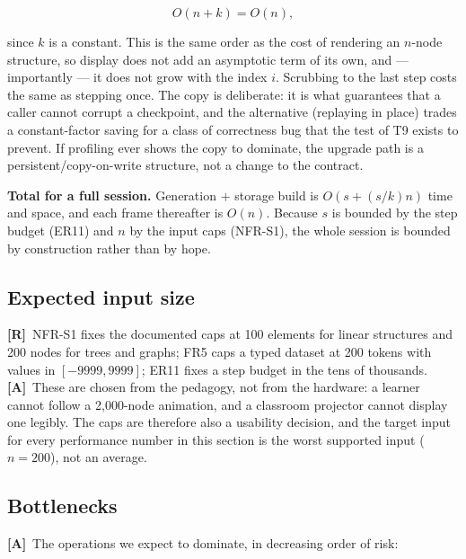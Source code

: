 \documentclass[11pt,a4paper]{article}
\newcommand{\R}{\textcolor{reqc}{\textbf{[R]}}}     %
\newcommand{\A}{\textcolor{asmc}{\textbf{[A]}}}     %
\begin{document}
\[
O(n + k) = O(n),
\]

since $k$ is a constant. This is the same order as the cost of rendering an $n$-node
structure, so display does not add an asymptotic term of its own, and --- importantly --- it
does not grow with the index $i$. Scrubbing to the last step costs the same as stepping once.
The copy is deliberate: it is what guarantees that a caller cannot corrupt a checkpoint, and
the alternative (replaying in place) trades a constant-factor saving for a class of
correctness bug that the test of T9 exists to prevent. If profiling ever shows the copy to
dominate, the upgrade path is a persistent/copy-on-write structure, not a change to the
contract.

\smallskip
\noindent\textbf{Total for a full session.} Generation $+$ storage build is
$O(s + (s/k)n)$ time and space, and each frame thereafter is $O(n)$. Because $s$ is bounded
by the step budget (ER11) and $n$ by the input caps (NFR-S1), the whole session is bounded by
construction rather than by hope.

\subsection{Expected input size}

\R\ NFR-S1 fixes the documented caps at 100 elements for linear structures and 200 nodes for
trees and graphs; FR5 caps a typed dataset at 200 tokens with values in $[-9999, 9999]$; ER11
fixes a step budget in the tens of thousands. \A\ These are chosen from the pedagogy, not
from the hardware: a learner cannot follow a 2{,}000-node animation, and a classroom projector
cannot display one legibly. The caps are therefore also a usability decision, and the target
input for every performance number in this section is the worst supported input ($n = 200$),
not an average.

\subsection{Bottlenecks}

\A\ The operations we expect to dominate, in decreasing order of risk:
\end{document}
